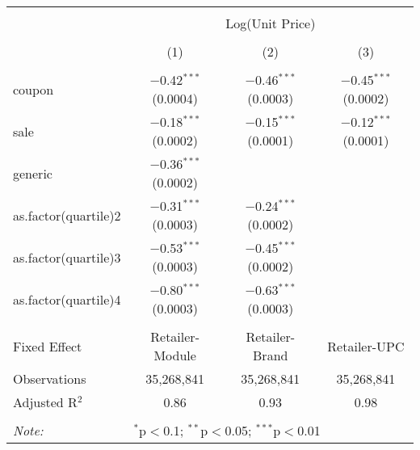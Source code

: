 
\begin{table}[!htbp] \centering 
  \caption{} 
  \label{tab:overallSavings} 
\begin{tabular}{@{\extracolsep{5pt}}lccc} 
\\[-1.8ex]\hline 
\hline \\[-1.8ex] 
 & \multicolumn{3}{c}{Log(Unit Price)} \\ 
\\[-1.8ex] & (1) & (2) & (3)\\ 
\hline \\[-1.8ex] 
 coupon & $-$0.42$^{***}$ (0.0004) & $-$0.46$^{***}$ (0.0003) & $-$0.45$^{***}$ (0.0002) \\ 
  sale & $-$0.18$^{***}$ (0.0002) & $-$0.15$^{***}$ (0.0001) & $-$0.12$^{***}$ (0.0001) \\ 
  generic & $-$0.36$^{***}$ (0.0002) &  &  \\ 
  as.factor(quartile)2 & $-$0.31$^{***}$ (0.0003) & $-$0.24$^{***}$ (0.0002) &  \\ 
  as.factor(quartile)3 & $-$0.53$^{***}$ (0.0003) & $-$0.45$^{***}$ (0.0002) &  \\ 
  as.factor(quartile)4 & $-$0.80$^{***}$ (0.0003) & $-$0.63$^{***}$ (0.0003) &  \\ 
 \hline \\[-1.8ex] 
Fixed Effect & Retailer-Module & Retailer-Brand & Retailer-UPC \\ 
Observations & 35,268,841 & 35,268,841 & 35,268,841 \\ 
Adjusted R$^{2}$ & 0.86 & 0.93 & 0.98 \\ 
\hline 
\hline \\[-1.8ex] 
\textit{Note:}  & \multicolumn{3}{l}{$^{*}$p$<$0.1; $^{**}$p$<$0.05; $^{***}$p$<$0.01} \\ 
\end{tabular} 
\end{table} 
